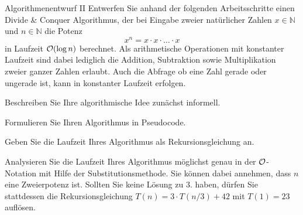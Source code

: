 \documentclass{exercisesheet}
\begin{document}
\begin{eexercises}{Algorithmenentwurf II}{
    Entwerfen Sie anhand der folgenden Arbeitsschritte einen Divide \& Conquer Algorithmus, der bei Eingabe zweier natürlicher Zahlen $x \in \mathbb{N}$ und $n \in \mathbb{N}$ die Potenz
    \begin{equation*}
      x^n = x \cdot x \cdot \ldots \cdot x
    \end{equation*}
    in Laufzeit $\mathcal{O}(\log n)$ berechnet. Als arithmetische Operationen mit konstanter Laufzeit sind dabei lediglich die Addition, Subtraktion sowie Multiplikation zweier ganzer Zahlen erlaubt. Auch die Abfrage ob eine Zahl gerade oder ungerade ist, kann in konstanter Laufzeit erfolgen.
  }
  \item Beschreiben Sie Ihre algorithmische Idee zunächst informell.
  \item Formulieren Sie Ihren Algorithmus in Pseudocode.
  \item Geben Sie die Laufzeit Ihres Algorithmus als Rekursionsgleichung an.
  \item Analysieren Sie die Laufzeit Ihres Algorithmus möglichst genau in der $\mathcal{O}$-Notation mit Hilfe der Substitutionsmethode. Sie können dabei annehmen, dass $n$ eine Zweierpotenz ist. Sollten Sie keine Lösung zu 3. haben, dürfen Sie stattdessen die Rekursionsgleichung $T(n) = 3 \cdot T(n/3) + 42$ mit $T(1) = 23$ auflösen.
\end{eexercises}
\end{document}

